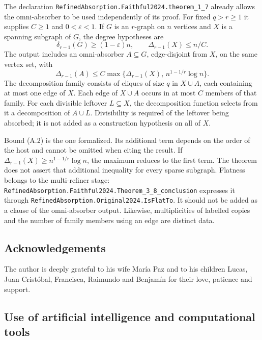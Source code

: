 \documentclass[english,11pt,a4paper]{article}
\begin{document}
The declaration \texttt{Refined\allowbreak{}Absorption.\allowbreak{}Faithful2024.\allowbreak{}theorem\_\allowbreak{}1\_\allowbreak{}7} already allows the omni-absorber to be used independently of its proof. For fixed \(q>r\ge1\) it supplies \(C\ge1\) and \(0<\varepsilon<1\). If \(G\) is an \(r\)-graph on \(n\) vertices and \(X\) is a spanning subgraph of \(G\), the degree hypotheses are \[\delta_{r-1}(G)\ge(1-\varepsilon)n,
\qquad \Delta_{r-1}(X)\le n/C.
\tag{A.1}\] The output includes an omni-absorber \(A\subseteq G\), edge-disjoint from \(X\), on the same vertex set, with \[\Delta_{r-1}(A)\le C\max\{\Delta_{r-1}(X),\,n^{1-1/r}\log n\}.
\tag{A.2}\] The decomposition family consists of cliques of size \(q\) in \(X\cup A\), each containing at most one edge of \(X\). Each edge of \(X\cup A\) occurs in at most \(C\) members of that family. For each divisible leftover \(L\subseteq X\), the decomposition function selects from it a decomposition of \(A\cup L\). Divisibility is required of the leftover being absorbed; it is not added as a construction hypothesis on all of \(X\).

Bound (A.2) is the one formalized. Its additional term depends on the order of the host and cannot be omitted when citing the result. If \(\Delta_{r-1}(X)\ge n^{1-1/r}\log n\), the maximum reduces to the first term. The theorem does not assert that additional inequality for every sparse subgraph. Flatness belongs to the multi-refiner stage: \texttt{Refined\allowbreak{}Absorption.\allowbreak{}Faithful2024.\allowbreak{}Theorem\_\allowbreak{}3\_\allowbreak{}8\_\allowbreak{}conclusion} expresses it through \texttt{Refined\allowbreak{}Absorption.\allowbreak{}Original2024.\allowbreak{}Is\allowbreak{}Flat\allowbreak{}To}. It should not be added as a clause of the omni-absorber output. Likewise, multiplicities of labelled copies and the number of family members using an edge are distinct data.

\subsection{Acknowledgements}\label{acknowledgements}

The author is deeply grateful to his wife María Paz and to his children Lucas, Juan Cristóbal, Francisca, Raimundo and Benjamín for their love, patience and support.

\subsection{Use of artificial intelligence and computational tools}\label{use-of-artificial-intelligence-and-computational-tools}
\end{document}
